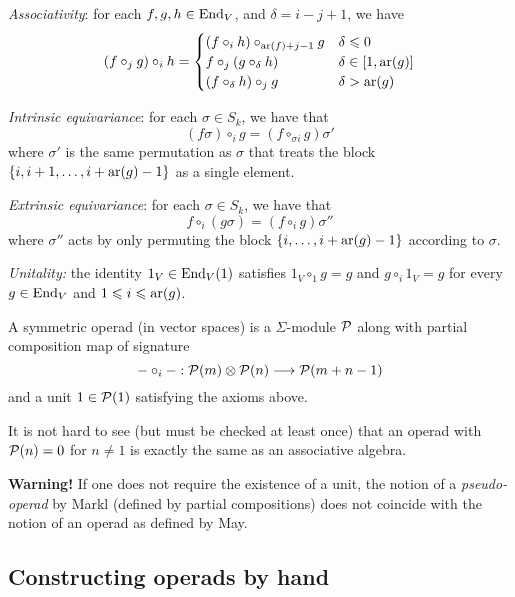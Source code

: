 \begin{tenumerate}
\item \emph{Associativity}: for
each $f,g,h\in\operatorname{End}_V$, and $\delta = i-j+1$,
we have
\[ 
(f \circ_j g) \circ_i h  = 
 	\begin{cases} 
 		 (f \circ_i h) \circ_{\operatorname{ar}(f)+j-1} g
 		  	& \delta \leqslant 0  \\
 		  	f\circ_j (g \circ_\delta h) &
 		  	\delta\in [1,\operatorname{ar}(g)] \\
 		  	(f \circ_\delta h) \circ_j g & \delta > \operatorname{ar}(g)
 		   \end{cases}
 		 \]
\item \emph{Intrinsic equivariance}: for
each $\sigma\in S_k$, we have that
\[  (f\sigma) \circ_i g  = (f\circ_{\sigma i} g)\sigma'\]
where $\sigma'$ is the same permutation as $\sigma$
that treats the block $\{i,i+1,\ldots,i+\operatorname{ar}(g)-1\}$
as a single element. 
\item \emph{Extrinsic equivariance}: 
 for each $\sigma\in S_k$, we have that
\[  f \circ_i (g\sigma)  = (f\circ_i g)\sigma''\]
where $\sigma''$ acts by only permuting the
block $\{i,\ldots,i+\operatorname{ar}(g)-1\}$ according
to $\sigma$.
\item \emph{Unitality:} the identity $1_V\in\operatorname{End}_V(1)$
satisfies $1_V\circ_1 g = g$ and $g\circ_i 1_V = g$ for every $g\in\operatorname{End}_V$ and $1\leqslant i\leqslant \operatorname{ar}(g)$.
\end{tenumerate}

\begin{definition}
A symmetric operad (in vector spaces) is a
$\Sigma$-module ${\mathcal{P}}$ along with partial composition
map of signature
\[ -\circ_i -  : {\mathcal{P}}(m)\otimes {\mathcal{P}}(n) 
	\longrightarrow {\mathcal{P}}(m+n-1) \]
and a unit $1\in{\mathcal{P}}(1)$ satisfying the axioms above.
\end{definition}

It is not hard to see (but must be checked at least once)
that an operad with ${\mathcal{P}}(n) = 0$ for $n\neq 1$ is
exactly the same as an associative algebra. 

\textbf{Warning!} If one does not require
the existence of a unit, the notion of a
\emph{pseudo-operad} by Markl (defined by partial
compositions) does not coincide with the
notion of an operad as defined by May.


\subsection{Constructing operads by hand}


